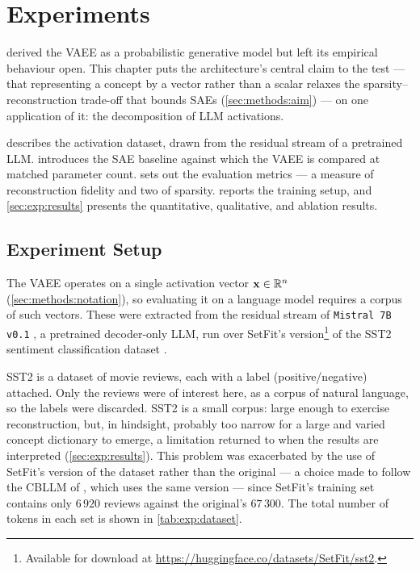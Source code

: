 \chapter{Experiments} \label{ch:exp}

 derived the \ac{VAEE} as a probabilistic
generative model but left its empirical behaviour open. This chapter puts the
architecture's central claim to the test --- that representing a concept by a
vector rather than a scalar relaxes the sparsity--reconstruction trade-off that
bounds \acp{SAE} (\cref{sec:methods:aim}) --- on
one application of it: the decomposition of \ac{LLM} activations.

 describes the activation
dataset, drawn from the residual stream of a pretrained \ac{LLM}.
 introduces the
\ac{SAE} baseline against which the \ac{VAEE} is compared at matched parameter
count.  sets
out the evaluation metrics --- a measure of reconstruction fidelity and two of
sparsity.  reports
the training setup, and \cref{sec:exp:results}
presents the quantitative, qualitative, and ablation
results.

\section{Experiment Setup} \label{sec:exp:setup}

The \ac{VAEE} operates on a single activation vector $\vb{x} \in \mathbb{R}^{n}$
(\cref{sec:methods:notation}), so evaluating it on a
language model requires a corpus of such vectors. These were extracted from the
residual stream of \texttt{Mistral 7B v0.1} \citep{jiangMistral7B2023}, a
pretrained decoder-only \ac{LLM}, run over SetFit's version\footnote{Available
for download at \url{https://huggingface.co/datasets/SetFit/sst2}.} of the
\ac{SST2} sentiment classification dataset
\citep{socherRecursiveDeepModels2013}.

\Ac{SST2} is a dataset of movie reviews, each with a label (positive/negative)
attached. Only the reviews were of interest here, as a corpus of natural
language, so the labels were discarded. \Ac{SST2} is a small corpus: large
enough to exercise reconstruction, but, in hindsight, probably too narrow for a
large and varied concept dictionary to emerge, a limitation returned to when the
results are interpreted (\cref{sec:exp:results}). This
problem was exacerbated by the use of SetFit's version of the dataset rather
than the original --- a choice made to follow the \ac{CBLLM} of
\citet{sunConceptBottleneckLarge2025a}, which uses the same version --- since
SetFit's training set contains only $6\,920$ reviews against the original's
$67\,300$. The total number of tokens in each set is shown in
\cref{tab:exp:dataset}.

